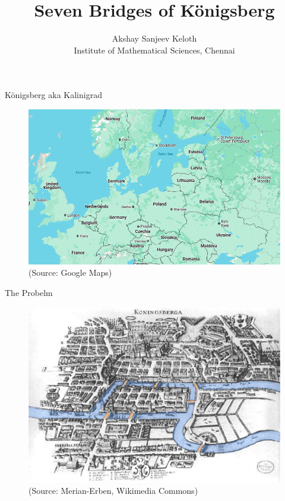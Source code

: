 \documentclass[mathserif]{beamer}
\title{\textbf{Seven Bridges of K\"{o}nigsberg}}
\subtitle{}
\author{Akshay Sanjeev Keloth\\ \small Institute of Mathematical Sciences, Chennai}
\begin{document}
\begin{frame}
\maketitle
\end{frame}

\begin{frame}{K\"{o}nigsberg aka Kalinigrad}
    \begin{figure}
        \centering
        \includegraphics[scale=.5]{bigmap.png}
        \caption{(Source: Google Maps)}
    \end{figure}
\end{frame}



\begin{frame}{The Probelm}
    \begin{figure}
        \centering
        \includegraphics[scale=.25]{map1.png}
        \caption{(Source: Merian-Erben, Wikimedia Commons)}
    \end{figure} 
\end{frame}
\end{document}

